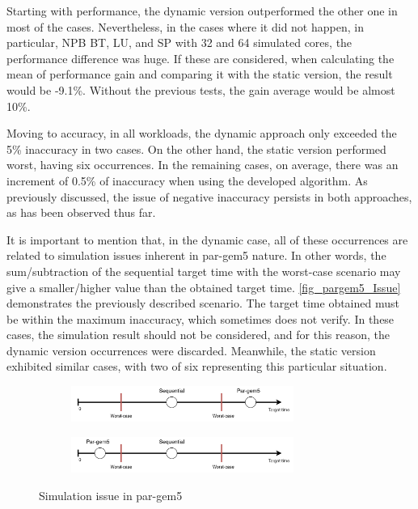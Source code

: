 Starting with performance, the dynamic version outperformed the other one in most of the cases. Nevertheless, in the cases where it 
did not happen, in particular, NPB BT, LU, and SP with 32 and 64 simulated cores, the performance difference was huge. If these are considered,
when calculating the mean of performance gain and comparing it with the static version, the result would be -9.1\%. Without the previous 
tests, the gain average would be almost 10\%. 

Moving to accuracy, in all workloads, the dynamic approach only exceeded the 5\% inaccuracy in two cases. On the other hand, the static 
version performed worst, having six occurrences. In the remaining cases, on average, there was an increment of 0.5\% of inaccuracy when 
using the developed algorithm. As previously discussed, the issue of negative inaccuracy persists in both approaches, as has been observed thus far.

It is important to mention that, in the dynamic case, all of these occurrences are related to 
simulation issues inherent in par-gem5 nature. In other words, the sum/subtraction of the sequential target time with the 
worst-case scenario may give a smaller/higher value than the obtained target time. \autoref{fig_pargem5_Issue} demonstrates the previously described 
scenario. The target time obtained must be within the maximum inaccuracy, which sometimes does not verify. In these cases, the simulation result 
should not be considered, and for this reason, the dynamic version occurrences were discarded. Meanwhile, the static version exhibited similar cases, 
with two of six representing this particular situation. 

\begin{figure}[H]
    \centering
    \begin{subfigure}{\textwidth}
        \centering
        \includegraphics[width=0.8\textwidth]{Images/pargem5_Issue1.png}
    \end{subfigure}
    \begin{subfigure}{\textwidth}
        \centering
        \includegraphics[width=0.8\textwidth]{Images/pargem5_Issue2.png}
    \end{subfigure}

    \caption{Simulation issue in par-gem5}
	\label{fig_pargem5_Issue}
\end{figure}


